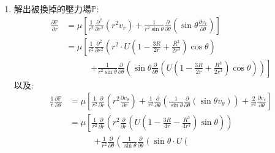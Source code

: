 \documentclass[../main.tex]{subfiles}
\begin{document}
\begin{itemize}
\begin{enumerate}
\begin{align}
      &= \frac{-1}{r\sin\theta} \cdot \sin^2\theta \cdot \left(
        \frac{U}{4} R^3 \cdot r^{-2} + \frac{3U}{4} R - U r
      \right) \nonumber\\
      &= \left(-\frac{U}{4} \cdot \frac{R^3}{r^3} - \frac{3U}{4} \cdot \frac{R}{r} + U\right) \sin\theta \nonumber\\
      \Rightarrow\quad & \boxed{v_\theta = U \left(
        1 - \frac{3R}{4r} - \frac{R^3}{4r^3}
      \right) \sin\theta} \label{eq:ch2_3_stokes_sphere_vtheta}
    \end{align}
  \item 解出被換掉的壓力場$\mathbb{P}$:
  \begin{align}
    \frac{\partial \mathbb{P}}{\partial r} &= \mu \left[
      \frac{1}{r^2}\frac{\partial^2}{\partial r^2}(r^2 v_r)+\frac{1}{r^2\sin\theta}\frac{\partial}{\partial \theta}\left(
        \sin\theta \frac{\partial v_r}{\partial \theta}\right)
    \right] \nonumber\\
    &= \mu \left[
      \frac{1}{r^2}\frac{\partial^2}{\partial r^2}\left(
        r^2 \cdot U \left(
          1 - \frac{3R}{2r} + \frac{R^3}{2r^3}
        \right) \cos\theta
      \right) \right.\nonumber\\
      &\phantom{=\mu\quad} \left.+ \frac{1}{r^2\sin\theta}\frac{\partial}{\partial \theta}\left(
        \sin\theta \frac{\partial }{\partial \theta} \left(
          U \left(
            1 - \frac{3R}{2r} + \frac{R^3}{2r^3}
          \right) \cos\theta
        \right)\right)
    \right]
  \end{align}
  以及:
  \begin{align}
    \frac{1}{r}\frac{\partial \mathbb{P}}{\partial \theta} &= \mu \left[
      \frac{1}{r^2}\frac{\partial}{\partial r}\left(
        r^2 \frac{\partial v_\theta}{\partial r}
      \right) + \frac{1}{r^2}\frac{\partial}{\partial \theta}\left(
        \frac{1}{\sin\theta}\frac{\partial}{\partial \theta}(\sin\theta v_\theta)
      \right) + \frac{2}{r^2}\frac{\partial v_r}{\partial \theta} 
    \right] \nonumber\\
    &= \mu \left[
      \frac{1}{r^2}\frac{\partial}{\partial r}\left(
        r^2 \frac{\partial }{\partial r} \left(
          U \left(
            1 - \frac{3R}{4r} - \frac{R^3}{4r^3}
          \right) \sin\theta
        \right)
      \right) \right.\nonumber\\
      &\phantom{=\mu\quad} \left.+ \frac{1}{r^2}\frac{\partial}{\partial \theta}\left(
        \frac{1}{\sin\theta}\frac{\partial}{\partial \theta}\left(
          \sin\theta \cdot U \left(

\end{align}
\end{enumerate}
\end{itemize}
\end{document}
